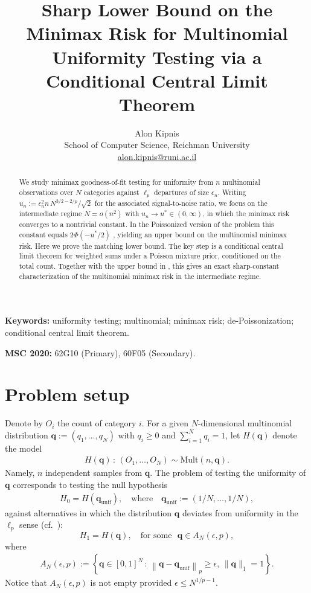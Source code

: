 \documentclass[11pt]{article}
\title{Sharp Lower Bound on the Minimax Risk for Multinomial Uniformity Testing via a Conditional Central Limit Theorem}
\author{Alon Kipnis\\
School of Computer Science, Reichman University\\
\href{mailto:alon.kipnis@runi.ac.il}{alon.kipnis@runi.ac.il}}
\date{}
\numberwithin{equation}{section}
\newcommand{\unif}{\mathrm{unif}}
\newcommand{\Multi}{\mathrm{Mult}}
\begin{document}
\maketitle

\begin{abstract}
We study minimax goodness-of-fit testing for uniformity from $n$ multinomial observations over $N$ categories against $\ell_p$ departures of size $\epsilon_n$. Writing $u_n:=\epsilon_n^2 n\,N^{3/2-2/p}/\sqrt{2}$ for the associated signal-to-noise ratio, we focus on the intermediate regime $N=o(n^2)$ with $u_n\to u^*\in(0,\infty)$, in which the minimax risk converges to a nontrivial constant. In the Poissonized version of the problem this constant equals $2\Phi(-u^*/2)$ \cite{Kipnis2025minimax}, yielding an upper bound on the multinomial minimax risk. Here we prove the matching lower bound. The key step is a conditional central limit theorem for weighted sums under a Poisson mixture prior, conditioned on the total count. Together with the upper bound in \cite{Kipnis2025minimax}, this gives an exact sharp-constant characterization of the multinomial minimax risk in the intermediate regime.
\end{abstract}

\medskip
\noindent\textbf{Keywords:} uniformity testing; multinomial; minimax risk; de-Poissonization; conditional central limit theorem.

\medskip
\noindent\textbf{MSC 2020:} 62G10 (Primary), 60F05 (Secondary).

\section{Problem setup}
\label{sec:setup}

Denote by $O_i$ the count of category $i$. For a given $N$-dimensional multinomial distribution $\mathbf{q} := (q_1,\ldots,q_N)$ with $q_i \geq 0$ and $\sum_{i=1}^N q_i = 1$, let $H(\mathbf{q})$ denote the model
\begin{align}
    \label{eq:hyp_Q}
H(\mathbf{q}) \,:\, (O_1,\ldots,O_N) \sim \Multi(n,\mathbf{q}).
\end{align}
Namely, $n$ independent samples from $\mathbf{q}$. 
The problem of testing the uniformity of $\mathbf{q}$ corresponds to testing the null hypothesis 
\begin{align}
    H_0 = H(\mathbf{q}_{\unif}),\quad \text{where} \quad \mathbf{q}_{\unif} := (1/N,\ldots,1/N), 
    \label{eq:null_hyp}
\end{align} 
against alternatives in which the distribution $\mathbf{q}$ deviates from uniformity in the $\ell_p$ sense (cf.\ \cite{ingster2003nonparametric,chhor2022sharp}):
\[
H_1 = H(\mathbf{q}),\quad \text{for some~~} \mathbf{q} \in A_N(\epsilon,p),
\]
where 
\begin{align}
    \label{eq:alt_hyp_def}
A_N(\epsilon,p) := \left\{ \mathbf{q} \in [0,1]^N \, :\, \left\| \mathbf{q} - \mathbf{q}_{\unif} \right\|_p \geq \epsilon, \, \|\mathbf{q}\|_1 = 1 \right\}.
\end{align}
Notice that $A_N(\epsilon,p)$ is not empty provided $\epsilon \leq N^{1/p-1}$. 
\end{document}
